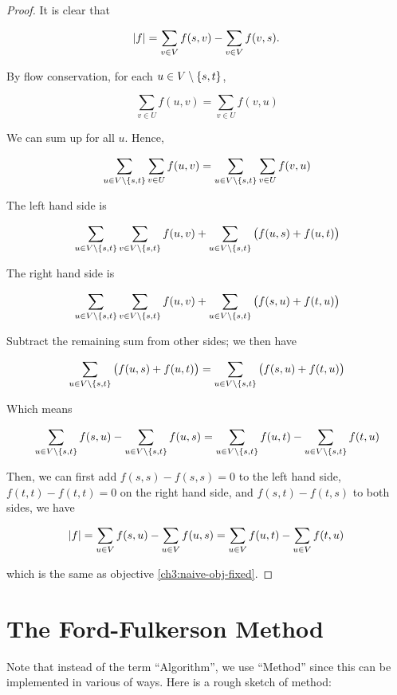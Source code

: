 \begin{proof}
    It is clear that 

    \[
        \abs{f} = \sum_{v \in V} f(s,v) - \sum_{v \in V} f(v,s).
    \]

    By flow conservation, for each $u \in V \setminus \cbr{s, t}$, 

    \[
        \sum_{v \in U} f(u,v) = \sum_{v \in U} f(v,u)
    \]

    We can sum up for all $u$. Hence, 

    \[
        \sum_{u \in V\setminus\cbr{s,t}} \sum_{v \in U} f(u,v) =  \sum_{u \in V\setminus\cbr{s,t}} \sum_{v \in U} f(v,u)
    \]

    The left hand side is 

    \[
        \sum_{u \in V\setminus\cbr{s,t}} \sum_{v \in V\setminus \cbr{s,t}} f(u,v) + \sum_{u \in V\setminus\cbr{s,t}} \del{ f(u,s) + f(u,t)}
    \]

    The right hand side is 

    \[
        \sum_{u \in V\setminus\cbr{s,t}} \sum_{v \in V\setminus \cbr{s,t}} f(u,v) + \sum_{u \in V\setminus\cbr{s,t}} \del{ f(s,u) + f(t,u)}
    \]

    Subtract the remaining sum from other sides; we then have 

    \[
        \sum_{u \in V\setminus\cbr{s,t}} \del{ f(u,s) + f(u,t)} = \sum_{u \in V\setminus\cbr{s,t}} \del{ f(s,u) + f(t,u)}
    \]

    Which means 

    \[
        \sum_{u \in V\setminus\cbr{s,t}} f(s,u) - \sum_{u \in V\setminus\cbr{s,t}} f(u,s) = \sum_{u \in V\setminus\cbr{s,t}} f(u,t) - \sum_{u \in V\setminus\cbr{s,t}} f(t,u)
    \]

    Then, we can first add $f(s,s)-f(s,s)=0$ to the left hand side, $f(t,t)-f(t,t)=0$ on the right hand side, and $f(s,t)-f(t,s)$ to both sides, we have 

    \[
	\abs{f}=\sum_{u \in V} f(s,u) - \sum_{u \in V} f(u,s) = \sum_{u \in V} f(u,t) - \sum_{u \in V} f(t,u)
    \]

    which is the same as objective \ref{ch3:naive-obj-fixed}. 
\end{proof}

\section{The Ford-Fulkerson Method}

Note that instead of the term ``Algorithm'', we use ``Method'' since this can be implemented in various of ways. 
Here is a rough sketch of method: 

